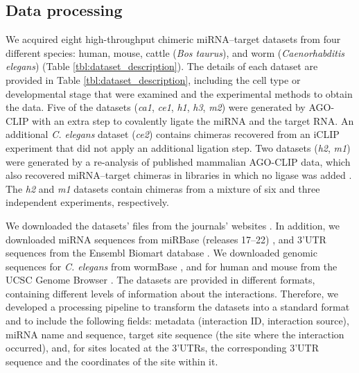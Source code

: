 \documentclass{bmcart}
\begin{document}
\subsection*{Data processing} \label{methods_dataprocessing}
We acquired eight high-throughput chimeric miRNA--target datasets from four different species: human, mouse, cattle (\textit{Bos taurus}), and worm (\textit{Caenorhabditis elegans}) (Table \ref{tbl:dataset_description}). 
The details of each dataset are provided in Table \ref{tbl:dataset_description}, including the cell type or developmental stage that were examined and the experimental methods to obtain the data. Five of the datasets (\textit{ca1}, \textit{ce1}, \textit{h1},  \textit{h3}, \textit{m2}) were generated by AGO-CLIP with an extra step to covalently ligate the miRNA and the target RNA.
An additional \textit{C. elegans} dataset (\textit{ce2}) contains chimeras recovered from an iCLIP experiment that did not apply an additional ligation step. Two datasets (\textit{h2}, \textit{m1}) were generated by a re-analysis of published mammalian AGO-CLIP data, which also recovered miRNA--target chimeras in libraries in which no ligase was added \cite{grosswendt2014unambiguous}. The \textit{h2} and \textit{m1} datasets contain chimeras from a mixture of six and three independent experiments, respectively.


We downloaded the datasets' files from the journals' websites \cite{scheel2017global, grosswendt2014unambiguous, broughton2016pairing, helwak2013mapping, darnell_moore2015mirna}. In addition, we downloaded miRNA sequences from miRBase (releases 17--22) \cite{kozomara2013mirbase}, and 3'UTR sequences from the Ensembl Biomart database \cite{smedley2015biomart}. We downloaded genomic sequences for \textit{C. elegans} from wormBase \cite{lee2017wormbase}, and for human and mouse from the UCSC Genome Browser \cite{karolchik2004ucsc}.
The datasets are provided in different formats, containing different levels of information about the interactions. Therefore, we developed a processing pipeline to transform the datasets into a standard format and to include the following fields: metadata (interaction ID, interaction source), miRNA name and sequence, target site sequence (the site where the interaction occurred), and, for sites located at the 3'UTRs, the corresponding 3'UTR sequence and the coordinates of the site within it.
\end{document}
